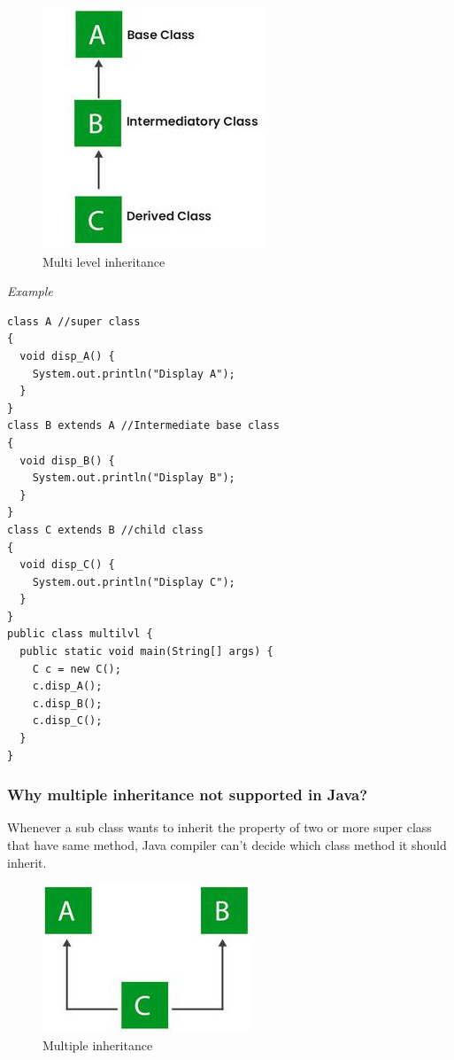\documentclass[twocolumn, a4paper]{article}
\begin{document}
\begin{figure}[h]
  \centering
  \includegraphics[width=0.8\columnwidth]{mullevin}
  \caption{Multi level inheritance}
\end{figure}

\vskip20pt
\noindent\emph{Example}
\begin{lstlisting}
class A //super class
{
  void disp_A() {
    System.out.println("Display A");
  }
}
class B extends A //Intermediate base class
{
  void disp_B() {
    System.out.println("Display B");
  }
}
class C extends B //child class
{
  void disp_C() {
    System.out.println("Display C");
  }
}
public class multilvl {
  public static void main(String[] args) {
    C c = new C();
    c.disp_A();
    c.disp_B();
    c.disp_C();
  }
}
\end{lstlisting}

\subsubsection{Why multiple inheritance not supported in Java?}
Whenever a sub class wants to inherit the property of two or more super class
that have same method, Java compiler can't decide which class method it should
inherit.

\begin{figure}[h]
  \centering
  \includegraphics[width=0.8\columnwidth]{multiin}
  \caption{Multiple inheritance}
\end{figure}
\end{document}
